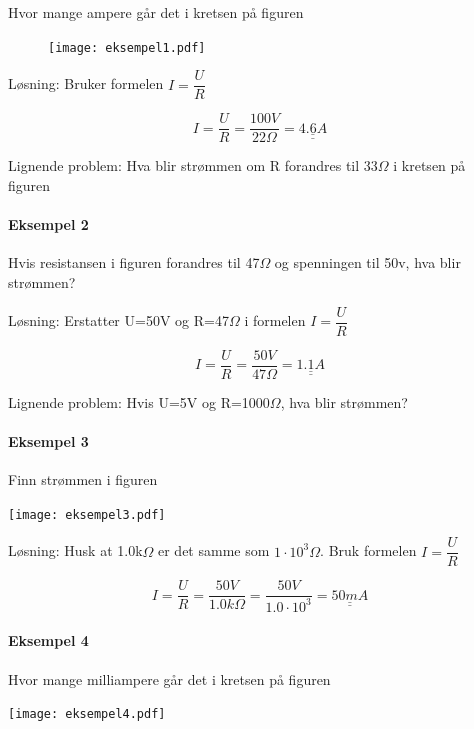 \documentclass[12pt,a4paper]{article}
\begin{document}
Hvor mange ampere går det i kretsen på figuren
\vskip 0.5cm
\begin{figure}[H]
	\begin{center}
\texttt{[image: eksempel1.pdf]}
	\end{center}
\end{figure}

\vskip 0.5cm
Løsning: Bruker formelen $I=\dfrac{U}{R}$

\[
I=\dfrac{U}{R}=\dfrac{100V}{22\Omega}=\underline{\underline{4.6A}}
\]

Lignende problem: Hva blir strømmen om R forandres til 33$\Omega$
i kretsen på figuren

\paragraph{Eksempel 2 }

Hvis resistansen i figuren forandres til 47$\Omega$ og
spenningen til 50v, hva blir strømmen?

\vskip 0.5cm
Løsning: Erstatter U=50V og R=47$\Omega$ i formelen $I=\dfrac{U}{R}$

\[
I=\dfrac{U}{R}=\dfrac{50V}{47\Omega}=\underline{\underline{1.1A}}
\]

Lignende problem: Hvis U=5V og R=1000$\Omega$, hva blir strømmen?

\paragraph{Eksempel 3}

Finn strømmen i figuren 

\vskip 0.5cm
\noindent \begin{centering}
\texttt{[image: eksempel3.pdf]}
\par\end{centering}

\vskip 0.5cm
Løsning: Husk at 1.0k$\Omega$ er det samme som $1\cdot10^{3}\Omega$.
Bruk formelen $I=\dfrac{U}{R}$

\[
I=\dfrac{U}{R}=\dfrac{50V}{1.0k\Omega}=\dfrac{50V}{1.0\cdot10^{3}}=\underline{\underline{50mA}}
\]


\paragraph{Eksempel 4}

Hvor mange milliampere går det i kretsen på figuren 

\vskip 0.5cm
\noindent \begin{centering}
\texttt{[image: eksempel4.pdf]}
\par\end{centering}
\end{document}
